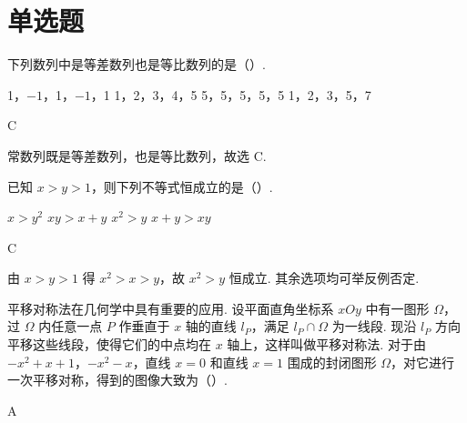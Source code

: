 \section{单选题}

\begin{problem}
下列数列中是等差数列也是等比数列的是（\quad）.

\choices
    {1，\(-1\)，1，\(-1\)，1}
    {1，2，3，4，5}
    {5，5，5，5，5}
    {1，2，3，5，7}
\end{problem}

\begin{answer}
C
\end{answer}

\begin{solution}
常数列既是等差数列，也是等比数列，故选 C.
\end{solution}

\begin{problem}
已知 \(x>y>1\)，则下列不等式恒成立的是（\quad）.

\choices
    {\(x>y^2\)}
    {\(xy>x+y\)}
    {\(x^2>y\)}
    {\(x+y>xy\)}
\end{problem}

\begin{answer}
C
\end{answer}

\begin{solution}
由 \(x>y>1\) 得 \(x^2>x>y\)，故 \(x^2>y\) 恒成立. 其余选项均可举反例否定.
\end{solution}

\begin{problem}
平移对称法在几何学中具有重要的应用. 设平面直角坐标系 \(xOy\) 中有一图形 \(\Omega\)，过 \(\Omega\) 内任意一点 \(P\) 作垂直于 \(x\) 轴的直线 \(l_P\)，满足 \(l_P\cap\Omega\) 为一线段. 现沿 \(l_P\) 方向平移这些线段，使得它们的中点均在 \(x\) 轴上，这样叫做平移对称法. 对于由 \(-x^2+x+1\)，\(-x^2-x\)，直线 \(x=0\) 和直线 \(x=1\) 围成的封闭图形 \(\Omega\)，对它进行一次平移对称，得到的图像大致为（\quad）.

\choices
    {}
    {}
    {}
    {}
\end{problem}

\begin{answer}
A
\end{answer}

